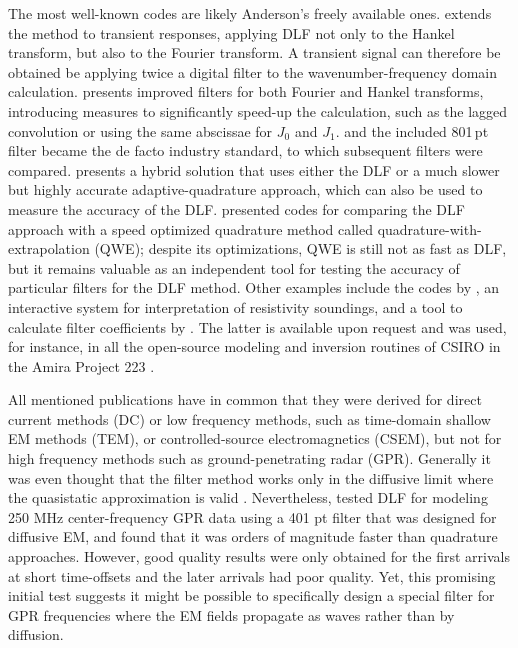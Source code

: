 \documentclass[a4paper, twoside, parskip, 10pt]{scrartcl}
\begin{document}
\begin{multicols}{2}
The most well-known codes are likely Anderson's freely available ones.
\cite{USGS.73.Anderson} extends the method to transient responses, applying DLF
not only to the Hankel transform, but also to the Fourier transform. A
transient signal can therefore be obtained be applying twice a digital filter
to the wavenumber-frequency domain calculation. \cite{USGS.75.Anderson,
GEO.79.Anderson} presents improved filters for both Fourier and Hankel
transforms, introducing measures to significantly speed-up the calculation,
such as the lagged convolution or using the same abscissae for $J_0$ and $J_1$.
\cite{TMS.82.Anderson} and the included 801\,pt filter became the de facto
industry standard, to which subsequent filters were compared.
\cite{GEO.89.Anderson} presents a hybrid solution that uses either the DLF or a
much slower but highly accurate adaptive-quadrature approach, which can also be
used to measure the accuracy of the DLF. \cite{GEO.12.Key} presented codes for
comparing the DLF approach with a speed optimized quadrature method called
quadrature-with-extrapolation (QWE); despite its optimizations, QWE is still
not as fast as DLF, but it remains valuable as an independent tool for testing
the accuracy of particular filters for the DLF method. Other examples include
the codes by \cite{GP.75.Johansen}, an interactive system for interpretation of
resistivity soundings, and a tool to calculate filter coefficients by
\cite{GP.90.Christensen}. The latter is available upon request and was used,
for instance, in all the open-source modeling and inversion routines of CSIRO
in the Amira Project 223 \citep{ASEG.07.Raiche}.

All mentioned publications have in common that they were derived for direct
current methods (DC) or low frequency methods, such as time-domain shallow EM
methods (TEM), or controlled-source electromagnetics (CSEM), but not for high
frequency methods such as ground-pe\-ne\-tra\-ting radar (GPR). Generally it
was even thought that the filter method works only in the diffusive limit where
the quasistatic approximation is valid \citep[e.g.,][]{GEO.15.Hunziker}.
Nevertheless, \cite{GEO.17.Werthmuller} tested DLF for modeling 250 MHz
center-frequency GPR data using a 401 pt filter that was designed for diffusive
EM, and found that it was orders of magnitude faster than quadrature
approaches. However, good quality results were only obtained for the first
arrivals at short time-offsets and the later arrivals had poor quality. Yet,
this promising initial test suggests it might be possible to specifically
design a special filter for GPR frequencies where the EM fields propagate as
waves rather than by diffusion.


\end{multicols}
\end{document}
